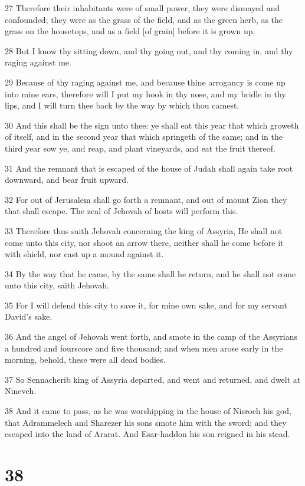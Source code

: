 \par 27 Therefore their inhabitants were of small power, they were dismayed and confounded; they were as the grass of the field, and as the green herb, as the grass on the housetops, and as a field [of grain] before it is grown up.
\par 28 But I know thy sitting down, and thy going out, and thy coming in, and thy raging against me.
\par 29 Because of thy raging against me, and because thine arrogancy is come up into mine ears, therefore will I put my hook in thy nose, and my bridle in thy lips, and I will turn thee back by the way by which thou camest.
\par 30 And this shall be the sign unto thee: ye shall eat this year that which groweth of itself, and in the second year that which springeth of the same; and in the third year sow ye, and reap, and plant vineyards, and eat the fruit thereof.
\par 31 And the remnant that is escaped of the house of Judah shall again take root downward, and bear fruit upward.
\par 32 For out of Jerusalem shall go forth a remnant, and out of mount Zion they that shall escape. The zeal of Jehovah of hosts will perform this.
\par 33 Therefore thus saith Jehovah concerning the king of Assyria, He shall not come unto this city, nor shoot an arrow there, neither shall he come before it with shield, nor cast up a mound against it.
\par 34 By the way that he came, by the same shall he return, and he shall not come unto this city, saith Jehovah.
\par 35 For I will defend this city to save it, for mine own sake, and for my servant David's sake.
\par 36 And the angel of Jehovah went forth, and smote in the camp of the Assyrians a hundred and fourscore and five thousand; and when men arose early in the morning, behold, these were all dead bodies.
\par 37 So Sennacherib king of Assyria departed, and went and returned, and dwelt at Nineveh.
\par 38 And it came to pass, as he was worshipping in the house of Nisroch his god, that Adrammelech and Sharezer his sons smote him with the sword; and they escaped into the land of Ararat. And Esar-haddon his son reigned in his stead.

\chapter{38}

